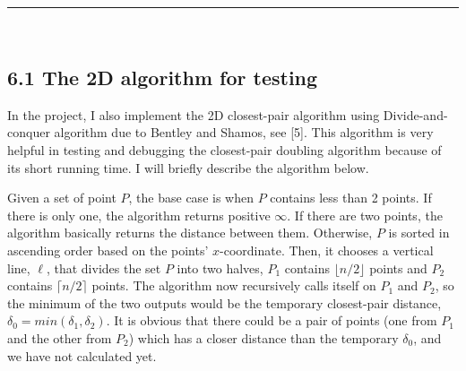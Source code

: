 \documentclass[12pt,english,]{article}
\let\origfigure\figure
\let\endorigfigure\endfigure
\renewenvironment{figure}[1][2] {
    \expandafter\origfigure\expandafter[H]
} {
    \endorigfigure
}
\begin{document}
\begin{figure}[!h]
\centering
{}

\caption{An example of generating points in a grid. A set of 35 points that gives us a $5\times7$ grid. Points are placed at corners of the squares whose sides are equal to $d$ that could be any number.}
\label{fig:grid}
\end{figure}

\hrule

~

\hypertarget{the-2d-algorithm-for-testing}{%
\subsection{6.1 The 2D algorithm for
testing}\label{the-2d-algorithm-for-testing}}

In the project, I also implement the 2D closest-pair algorithm using
Divide-and-conquer algorithm due to Bentley and Shamos, see {[}5{]}.
This algorithm is very helpful in testing and debugging the closest-pair
doubling algorithm because of its short running time. I will briefly
describe the algorithm below.

Given a set of point \(P\), the base case is when \(P\) contains less
than 2 points. If there is only one, the algorithm returns positive
\(\infty\). If there are two points, the algorithm basically returns the
distance between them. Otherwise, \(P\) is sorted in ascending order
based on the points' \(x\)-coordinate. Then, it chooses a vertical line,
\(\ell\), that divides the set \(P\) into two halves, \(P_1\) contains
\(\lfloor n/2 \rfloor\) points and \(P_2\) contains
\(\lceil n/2 \rceil\) points. The algorithm now recursively calls itself
on \(P_1\) and \(P_2\), so the minimum of the two outputs would be the
temporary closest-pair distance, \(\delta_0 = min(\delta_1, \delta_2)\).
It is obvious that there could be a pair of points (one from \(P_1\) and
the other from \(P_2\)) which has a closer distance than the temporary
\(\delta_0\), and we have not calculated yet.
\end{document}
